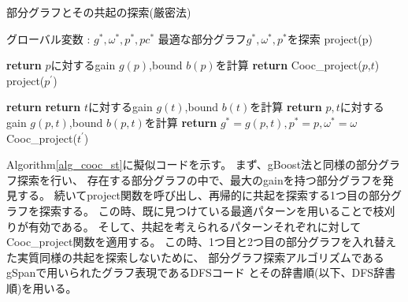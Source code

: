 \begin{algorithm}
  \small 
\caption{部分グラフとその共起の探索(厳密法)}\label{alg_cooc_st}
\begin{algorithmic}[1]
\State グローバル変数 : $g^*,\omega^*,p^*,pc^*$
\State 最適な部分グラフ$g^*,\omega^*,p^*$を探索 
\State project(p)
\EndFor
\EndProcedure

\State \textbf{return}
\EndIf
\State $p$に対するgain $g(p)$,bound $b(p)$を計算
\State \textbf{return}
\EndIf
{}
\State Cooc\_project($p$,$t$)
\EndFor
{}
\State project($p^{\prime}$)
\EndFor
\EndFunction

\State \textbf{return}
\EndIf
{} 
\State \textbf{return}
\EndIf
\State $t$に対するgain $g(t)$,bound $b(t)$を計算
\State \textbf{return}
\EndIf
\State $p,t$に対するgain $g(p,t)$,bound $b(p,t)$を計算
\State \textbf{return}
\EndIf
{}
\State $g^* = g(p,t),p^* = p,\omega^* = \omega$
\EndIf
{}
\State Cooc\_project($t^{\prime}$)
\EndFor
\EndFunction
\end{algorithmic}
\end{algorithm}

Algorithm\ref{alg_cooc_st}に擬似コードを示す。
まず、gBoost法と同様の部分グラフ探索を行い、
存在する部分グラフの中で、最大のgainを持つ部分グラフを発見する。
続いてproject関数を呼び出し、再帰的に共起を探索する1つ目の部分グラフを探索する。
この時、既に見つけている最適パターンを用いることで枝刈りが有効である。
そして、共起を考えられるパターンそれぞれに対してCooc\_project関数を適用する。
この時、1つ目と2つ目の部分グラフを入れ替えた実質同様の共起を探索しないために、
部分グラフ探索アルゴリズムであるgSpan\cite{gSpan}で用いられたグラフ表現であるDFSコード
とその辞書順(以下、DFS辞書順)を用いる。

